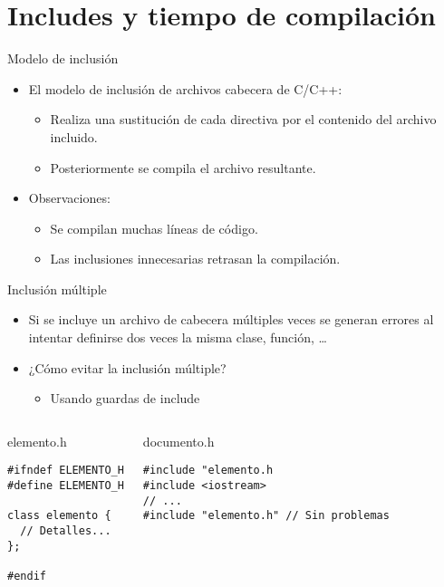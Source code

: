 \section{Includes y tiempo de compilación}

\begin{frame}[t]{Modelo de inclusión}
\begin{itemize}
  \item El modelo de inclusión de archivos cabecera de C/C++:
    \begin{itemize} 
      \item Realiza una sustitución de cada directiva por el
            contenido del archivo incluido.
      \item Posteriormente se compila el archivo resultante.
    \end{itemize}

  \vfill
  \item Observaciones:
    \begin{itemize}
      \item Se compilan muchas líneas de código.
      \item Las inclusiones innecesarias retrasan la compilación.
    \end{itemize}
\end{itemize}
\end{frame}

\begin{frame}[t,fragile]{Inclusión múltiple}
\begin{itemize}
  \item Si se incluye un archivo de cabecera múltiples veces se generan errores
        al intentar definirse dos veces la misma clase, función, \ldots

  \item ¿Cómo evitar la inclusión múltiple?
    \begin{itemize}
      \item Usando guardas de include
    \end{itemize}
\end{itemize}

\begin{columns}

\begin{block}{elemento.h}
\begin{lstlisting}[basicstyle=\tiny\ttfamily]
#ifndef ELEMENTO_H
#define ELEMENTO_H

class elemento {
  // Detalles...
};

#endif
\end{lstlisting}
\end{block}

\pause
{}
\begin{block}{documento.h}
\begin{lstlisting}[basicstyle=\tiny\ttfamily]
#include "elemento.h
#include <iostream>
// ...
#include "elemento.h" // Sin problemas
\end{lstlisting}
\end{block}

\end{columns}
\end{frame}

